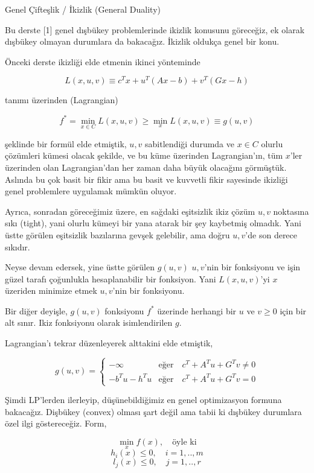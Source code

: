 \documentclass[12pt,fleqn]{article}\usepackage{../../common}
\begin{document}
Genel Çifteşlik / İkizlik (General Duality)

Bu derste [1] genel dışbükey problemlerinde ikizlik konusunu göreceğiz, ek
olarak dışbükey olmayan durumlara da bakacağız. İkizlik oldukça genel bir
konu.

Önceki derste ikizliği elde etmenin ikinci yönteminde 

$$
L(x,u,v) \equiv c^T x + u^T (Ax-b) + v^T (Gx-h) 
$$

tanımı üzerinden (Lagrangian)

$$
f^* = \min_{x \in C} L(x,u,v) \ge \min_x L(x,u,v) \equiv g(u,v)
$$

şeklinde bir formül elde etmiştik, $u,v$ sabitlendiği durumda ve $x \in C$
olurlu çözümleri kümesi olacak şekilde, ve bu küme üzerinden Lagrangian'ın,
tüm $x$'ler üzerinden olan Lagrangian'dan her zaman daha büyük olacağını
görmüştük. Aslında bu çok basit bir fikir ama bu basit ve kuvvetli fikir
sayesinde ikizliği genel problemlere uygulamak mümkün oluyor. 

Ayrıca, sonradan göreceğimiz üzere, en sağdaki eşitsizlik ikiz çözüm $u,v$
noktasına sıkı (tight), yani olurlu kümeyi bir yana atarak bir şey
kaybetmiş olmadık. Yani üstte görülen eşitsizlik bazılarına gevşek
gelebilir, ama doğru $u,v$'de son derece sıkıdır. 

Neyse devam edersek, yine üstte görülen $g(u,v)$ $u,v$'nin bir fonksiyonu
ve işin güzel tarafı çoğunlukla hesaplanabilir bir fonksiyon. Yani
$L(x,u,v)$'yi $x$ üzeriden minimize etmek $u,v$'nin bir fonksiyonu. 

Bir diğer deyişle, $g(u,v)$ fonksiyonu $f^*$ üzerinde herhangi bir $u$ ve
$v \ge 0$ için bir alt sınır. Ikiz fonksiyonu olarak isimlendirilen $g$.

Lagrangian'ı tekrar düzenleyerek alttakini elde etmiştik, 

$$
g(u,v) = \left\{ \begin{array}{ll}
-\infty & \text{eğer} \quad c^T + A^Tu + G^T v \ne 0 \\
- b^T u - h^Tu & \text{eğer} \quad c^T + A^Tu + G^T v = 0 
\end{array} \right.
$$

Şimdi LP'lerden ilerleyip, düşünebildiğimiz en genel optimizasyon formuna
bakacağız. Dişbükey (convex) olması şart değil ama tabii ki dışbükey
durumlara özel ilgi göstereceğiz. Form,

$$
\min_{x} f(x), \quad \textrm{öyle ki}
$$
$$
h_i(x) \le 0, \quad i=1,..,m
$$
$$
l_j(x) \le 0, \quad j=1,..,r
$$
\end{document}
